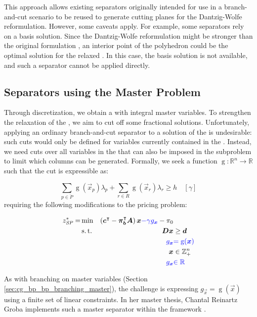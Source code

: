 This approach allows existing separators originally intended for use in a branch-and-cut scenario to be reused to generate cutting planes for the Dantzig-Wolfe reformulation. However, some caveats apply. For example, some separators rely on a basis solution. Since the Dantzig-Wolfe reformulation might be stronger than the original formulation \cite{thebook,bastubbe2018computational}, an interior point of the polyhedron could be the optimal solution for the relaxed \RMP{}. In this case, the basis solution is not available, and such a separator cannot be applied directly.

\subsection{Separators using the Master Problem}\label{sec:cg_bp_bpc_separators_master}
Through discretization, we obtain a \MP{} with integral master variables. To strengthen the \LP{} relaxation of the \MP{}, we aim to cut off some fractional solutions. Unfortunately, applying an ordinary branch-and-cut separator to a solution of the \RMP{} is undesirable: such cuts would only be defined for variables currently contained in the \RMP{}. Instead, we need cuts over all variables in the \MP{} that can also be imposed in the subproblem to limit which columns can be generated. Formally, we seek a function $\operatorname{g}: \mathbb{R}^n \to \mathbb{R}$ such that the cut is expressible as:

\begin{equation}
\sum_{p \in \ddot{P}} \operatorname{g}( \vec{x}_p ) \lambda_p + \sum_{r \in R} \operatorname{g}(  \vec{x}_r ) \lambda_r \geq h \quad \left[ \gamma \right]
\end{equation}
requiring the following modifications to the pricing problem:

\begin{equation}
\begin{aligned}
z^*_\SP{} = &\min & \left( \vec{c}\transpose - \vec{\pi}_\vec{b}\transpose \mat{A} \right) \vec{x} {\color{blue} - \gamma g_\vec{x}} - \pi_0 & \\
&\st & \mat{D} \vec{x} & \geq \vec{d} \\
&& {\color{blue} g_\vec{x}} & {\color{blue} = \operatorname{g}(\vec{x})} \\
&& \vec{x} & \in \mathbb{Z}_+^n \\
&& {\color{blue} g_\vec{x}} & {\color{blue} \in \mathbb{R}}
\end{aligned}
\end{equation}

As with branching on master variables (Section \ref{sec:cg_bp_bp_branching_master}), the challenge is expressing $g_\vec{x} = \operatorname{g}(\vec{x})$ using a finite set of linear constraints. In her master thesis, Chantal Reinartz Groba implements such a master separator within the \GCG{} framework \cite{reinartzgroba2024todo}.
